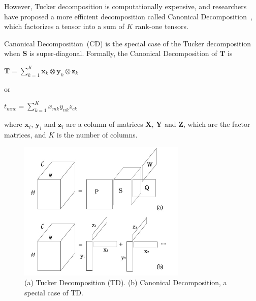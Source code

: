 
However, Tucker decomposition is computationally expensive, and researchers have proposed a more efficient decomposition called Canonical Decomposition~\cite{carroll1970analysis}, which factorizes a tensor into a sum of $K$ rank-one tensors.

Canonical Decomposition~(CD) is the special case of the Tucker decomposition when $\mathbf{S}$ is super-diagonal.
Formally, the Canonical Decomposition of $\mathbf{T}$ is
\begin{center}
$\mathbf{T}=\sum\limits_{k=1}^{K}\mathbf{x}_k\otimes \mathbf{y}_k\otimes \mathbf{z}_k$
\end{center}
or
\begin{center}
$t_{mnc}=\sum\limits_{k=1}^{K}x_{mk} y_{nk} z_{ck}$
\end{center}
where $\mathbf{x}_i$, $\mathbf{y}_i$ and $\mathbf{z}_i$ are a column of matrices $\mathbf{X}$, $\mathbf{Y}$ and $\mathbf{Z}$, which are the factor matrices, and $K$ is the number of columns. 

\begin{figure}[h] 
\includegraphics[width=8cm]{tf.jpg} 
\caption{(a) Tucker Decomposition (TD). (b) Canonical Decomposition, a special case of TD.}
\label{fig:tf:tuckcanon} 
\end{figure}


